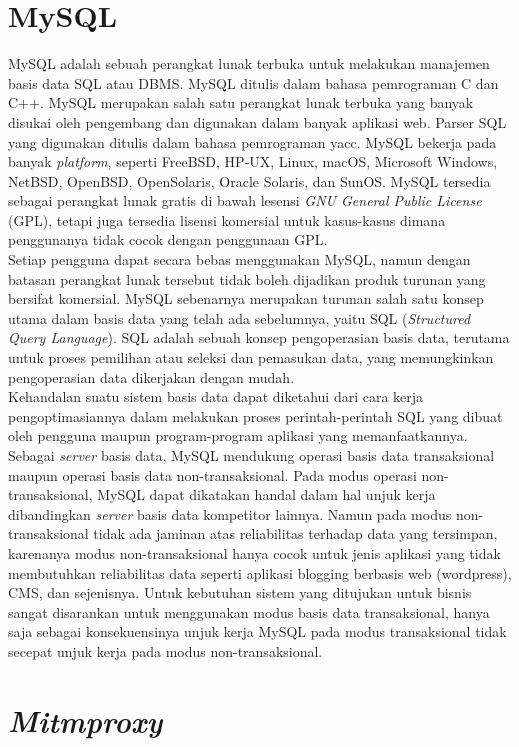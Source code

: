  \section{MySQL}
	 MySQL adalah sebuah perangkat lunak terbuka untuk melakukan manajemen basis data SQL atau DBMS. MySQL ditulis dalam bahasa pemrograman C dan C++. MySQL merupakan salah satu perangkat lunak terbuka yang banyak disukai oleh pengembang dan digunakan dalam banyak aplikasi web. Parser SQL yang digunakan ditulis dalam bahasa pemrograman yacc. MySQL bekerja pada banyak \textit{platform}, seperti  FreeBSD, HP-UX, Linux, macOS, Microsoft Windows, NetBSD, OpenBSD, OpenSolaris, Oracle Solaris, dan SunOS. MySQL tersedia sebagai perangkat lunak gratis di bawah lesensi \textit{GNU General Public License} (GPL), tetapi juga tersedia lisensi komersial untuk kasus-kasus dimana penggunanya tidak cocok dengan penggunaan GPL.\\
	 \indent Setiap pengguna dapat secara bebas menggunakan MySQL, namun dengan batasan perangkat lunak tersebut tidak boleh dijadikan produk turunan yang bersifat komersial. MySQL sebenarnya merupakan turunan salah satu konsep utama dalam basis data yang telah ada sebelumnya, yaitu SQL (\textit{Structured Query Language}). SQL adalah sebuah konsep pengoperasian basis data, terutama untuk proses pemilihan atau seleksi dan pemasukan data, yang memungkinkan pengoperasian data dikerjakan dengan mudah.\\
	 \indent Kehandalan suatu sistem basis data dapat diketahui dari cara kerja pengoptimasiannya dalam melakukan proses perintah-perintah SQL yang dibuat oleh pengguna maupun program-program aplikasi yang memanfaatkannya. Sebagai \textit{server} basis data, MySQL mendukung operasi basis data transaksional maupun operasi basis data non-transaksional. Pada modus operasi non-transaksional, MySQL dapat dikatakan handal dalam hal unjuk kerja dibandingkan \textit{server} basis data kompetitor lainnya. Namun pada modus non-transaksional tidak ada jaminan atas reliabilitas terhadap data yang tersimpan, karenanya modus non-transaksional hanya cocok untuk jenis aplikasi yang tidak membutuhkan reliabilitas data seperti aplikasi blogging berbasis web (wordpress), CMS, dan sejenisnya. Untuk kebutuhan sistem yang ditujukan untuk bisnis sangat disarankan untuk menggunakan modus basis data transaksional, hanya saja sebagai konsekuensinya unjuk kerja MySQL pada modus transaksional tidak secepat unjuk kerja pada modus non-transaksional.
	
	\section{\textit{Mitmproxy}}
	
